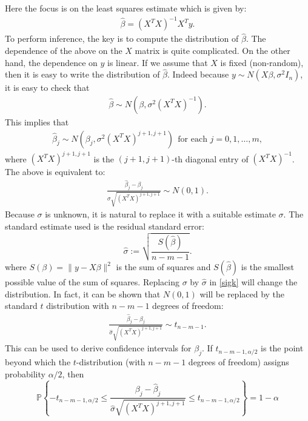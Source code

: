 \documentclass{scrartcl}
\renewcommand{\P}{{\mathbb P}}
\begin{document}
Here the focus is on the least squares estimate which is given by:
\begin{align*}
  \hat{\beta} = (X^T X)^{-1} X^T y. 
\end{align*}
To perform inference, the key is to compute the distribution of
$\hat{\beta}$. The dependence of the above on the $X$ matrix is quite
complicated. On the other hand, the dependence on $y$ is linear. If we
assume that $X$ is fixed (non-random), then it is easy to write the
distribution of $\hat{\beta}$. Indeed because $y \sim N(X \beta,
\sigma^2 I_n)$, it is easy to check that
\begin{align*}
  \hat{\beta} \sim N \left( \beta, \sigma^2 (X^T X)^{-1} \right). 
\end{align*}
This implies that
\begin{align*}
  \hat{\beta}_j \sim N(\beta_j, \sigma^2 (X^T X)^{j+1, j+1}) ~~ \text{
  for each } j = 0, 1, \dots, m, 
\end{align*}
where $(X^T X)^{j+1, j+1}$ is the $(j+1, j+1)$-th diagonal entry of
$(X^T X)^{-1}$. The above is equivalent to:
\begin{align}\label{sigk}
  \frac{\hat{\beta}_j - \beta_j}{\sigma \sqrt{(X^T X)^{j+1, j+1}}}
  \sim N(0, 1). 
\end{align}
Because $\sigma$ is unknown, it is natural to replace it with a
suitable estimate $\sigma$. The standard estimate used is the residual
standard error: 
\begin{equation*}
  \hat{\sigma} := \sqrt{\frac{S(\hat{\beta})}{n-m-1}}. 
\end{equation*}
where $S(\beta) = \|y - X \beta\|^2$ is the sum of squares and
$S(\hat{\beta})$ is the smallest possible value of the sum of
squares. Replacing $\sigma$ by $\hat{\sigma}$ in \eqref{sigk} will
change the distribution. In fact, it can be shown that $N(0, 1)$ will
be replaced by the standard $t$ distribution with $n-m-1$ degrees of
freedom:
\begin{align}\label{siguk}
  \frac{\hat{\beta}_j - \beta_j}{\hat{\sigma} \sqrt{(X^T X)^{j+1, j+1}}}
  \sim t_{n-m-1}. 
\end{align}
This can be used to derive confidence intervals for $\beta_j$. If 
  $t_{n-m-1, \alpha/2}$ is the point beyond which the $t$-distribution
  (with $n-m-1$ degrees of freedom) assigns probability $\alpha/2$,
  then
  \begin{equation*}
    \P \left\{-t_{n-m-1, \alpha/2} \leq     \frac{\beta_j - \hat{\beta}_j}{\hat{\sigma} \sqrt{(X^T X)^{j+1,
          j+1}}} \leq t_{n-m-1, \alpha/2}  \right\} = 
  1 - \alpha
\end{equation*}
\end{document}
